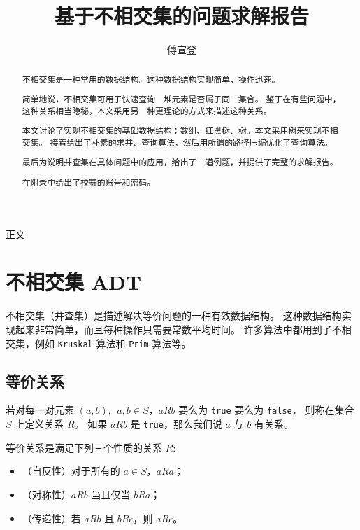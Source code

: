\documentclass[withoutpreface,bwprint]{cumcmthesis}
\title{基于不相交集的问题求解报告}
\author{傅宣登}
\begin{document}
\maketitle
\begin{abstract}

不相交集是一种常用的数据结构。这种数据结构实现简单，操作迅速。

简单地说，不相交集可用于快速查询一堆元素是否属于同一集合。
鉴于在有些问题中，这种关系相当隐秘，本文采用另一种更理论的方式来描述这种关系。

本文讨论了实现不相交集的基础数据结构：数组、红黑树、树。本文采用树来实现不相交集。
接着给出了朴素的求并、查询算法，然后用所谓的路径压缩优化了查询算法。

最后为说明并查集在具体问题中的应用，给出了一道例题，并提供了完整的求解报告。

在附录中给出了校赛的账号和密码。

\end{abstract}

\begin{center}%
	{\heiti 正文 \vspace{-.5em}}%
\end{center}%

\section{不相交集 ADT}

不相交集（并查集）是描述解决等价问题的一种有效数据结构。
这种数据结构实现起来非常简单，而且每种操作只需要常数平均时间。
许多算法中都用到了不相交集，例如 \verb|Kruskal| 算法和 \verb|Prim| 算法等。

\subsection{等价关系}

若对每一对元素 $(a, b),\ \ a,b \in S$，$aRb$ 要么为 \verb|true| 要么为 \verb|false|，
则称在集合 $S$ 上定义关系 $R$。
如果 $aRb$ 是 \verb|true|，那么我们说 $a$ 与 $b$ 有关系。

\begin{definition}[等价关系]
等价关系是满足下列三个性质的关系 $R$:
\begin{itemize}
\item （自反性）对于所有的 $a\in S$，$aRa$；
\item （对称性）$aRb$ 当且仅当 $bRa$；
\item （传递性）若 $aRb$ 且 $bRc$，则 $aRc$。
\end{itemize}
\end{definition}
\end{document}
